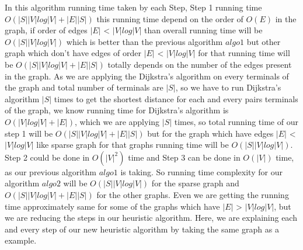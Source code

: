 In this algorithm running time taken by each Step, Step 1 running time $O(|S||V|log|V| +|E||S|)$ this running time depend on the order of $O(E)$ in the graph, if order of edges $|E|$ < $|V|log|V|$ than overall running time will be $O(|S||V|log|V|)$ which is better than the previous algorithm $algo1$ but other graph which don't have edges of order $|E|$ < $|V|log|V|$ for that running time will be $O(|S||V|log|V| +|E||S|)$ totally depends on the number of the edges present in the graph. As we are applying the Dijkstra's algorithm on every terminals of the graph and total number of terminals are $|S|$, so we have to run Dijkstra's algorithm $|S|$ times to get the shortest distance for each and every pairs terminals of the graph, we know running time for Dijkstra's algorithm is $O(|V|log|V| +|E|)$, which we are applying $|S|$ times, so total running time of our step 1 will be $O(|S||V|log|V| +|E||S|)$ but for the graph which have edges $|E|$ < $|V|log|V|$ like sparse graph for that graphs running time will be $O(|S||V|log|V|)$. Step 2 could be done in $O(|V|^2)$ time and Step 3 can be done in $O(|V|)$ time, as our previous algorithm $algo1$ is taking. So running time complexity for our algorithm $algo2$ will be $O(|S||V|log|V|)$ for the sparse graph and $O(|S||V|log|V| + |E||S|)$ for the other graphs. Even we are getting the running time approximately same for some of the graphs which have $|E|$ > $|V|log|V|$, but we are reducing the steps in our heuristic algorithm. Here, we are explaining each and every step of our new heuristic algorithm by taking the same graph as a example.\\

